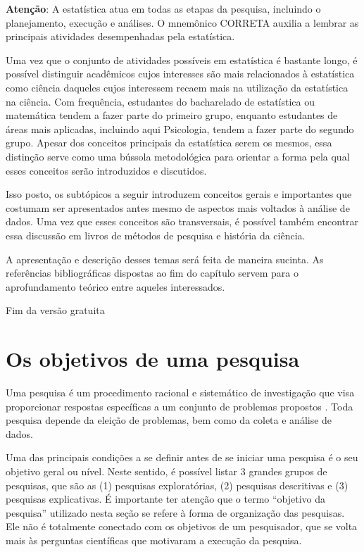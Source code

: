 \documentclass[
]{book}
\begin{document}
\textbf{Atenção}: A estatística atua em todas as etapas da pesquisa, incluindo o planejamento, execução e análises. O mnemônico CORRETA auxilia a lembrar as principais atividades desempenhadas pela estatística.

Uma vez que o conjunto de atividades possíveis em estatística é bastante longo, é possível distinguir acadêmicos cujos interesses são mais relacionados à estatística como ciência daqueles cujos interessem recaem mais na utilização da estatística na ciência. Com frequência, estudantes do bacharelado de estatística ou matemática tendem a fazer parte do primeiro grupo, enquanto estudantes de áreas mais aplicadas, incluindo aqui Psicologia, tendem a fazer parte do segundo grupo. Apesar dos conceitos principais da estatística serem os mesmos, essa distinção serve como uma bússola metodológica para orientar a forma pela qual esses conceitos serão introduzidos e discutidos.

Isso posto, os subtópicos a seguir introduzem conceitos gerais e importantes que costumam ser apresentados antes mesmo de aspectos mais voltados à análise de dados. Uma vez que esses conceitos são transversais, é possível também encontrar essa discussão em livros de métodos de pesquisa e história da ciência.

A apresentação e descrição desses temas será feita de maneira sucinta. As referências bibliográficas dispostas ao fim do capítulo servem para o aprofundamento teórico entre aqueles interessados.

Fim da versão gratuita

\hypertarget{os-objetivos-de-uma-pesquisa}{%
\section{Os objetivos de uma pesquisa}\label{os-objetivos-de-uma-pesquisa}}

Uma pesquisa é um procedimento racional e sistemático de investigação que visa proporcionar respostas específicas a um conjunto de problemas propostos \citep{gil2002}. Toda pesquisa depende da eleição de problemas, bem como da coleta e análise de dados.

Uma das principais condições a se definir antes de se iniciar uma pesquisa é o seu objetivo geral ou nível. Neste sentido, é possível listar 3 grandes grupos de pesquisas, que são as (1) pesquisas exploratórias, (2) pesquisas descritivas e (3) pesquisas explicativas. É importante ter atenção que o termo ``objetivo da pesquisa'' utilizado nesta seção se refere à forma de organização das pesquisas. Ele não é totalmente conectado com os objetivos de um pesquisador, que se volta mais às perguntas científicas que motivaram a execução da pesquisa.
\end{document}
